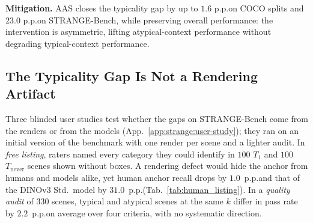 \begin{finding}
\textbf{Mitigation.} AAS closes the typicality gap by up to
$\mathbf{1.6}$ p.p.\@ on COCO splits and $\mathbf{23.0}$ p.p.\@ on
STRANGE-Bench, while preserving overall performance: the
intervention is asymmetric, lifting atypical-context performance
without degrading typical-context performance.
\end{finding}

\subsection{The Typicality Gap Is Not a Rendering Artifact}
\label{sec:results_human}
\vspace{-3.0pt}
\begin{table}
\vspace{-11pt}
\centering\footnotesize
\setlength{\tabcolsep}{3pt}
\captionsetup{font=small}
\caption{\textbf{Free listing}: anchor recall (\%); models: DINOv3 fine-tuned.}
\label{tab:human_listing}

\vspace{-10pt}
\end{table}
Three blinded user studies test whether the gaps on STRANGE-Bench come from the renders or from the models (App.~\ref{app:strange:user-study}); they ran on an initial version of the benchmark with one render per scene and a lighter audit. In \emph{free listing}, raters named every category they could identify in $100$ $T_1$ and $100$ $T_{\text{never}}$ scenes shown without boxes. A rendering defect would hide the anchor from humans and models alike, yet human anchor recall drops by $1.0$~p.p.\@ and that of the DINOv3 Std.\ model by $31.0$~p.p.\@ (Tab.~\ref{tab:human_listing}). In a \emph{quality audit} of $330$ scenes, typical and atypical scenes at the same $k$ differ in pass rate by $2.2$~p.p.\@ on average over four criteria, with no systematic direction.

